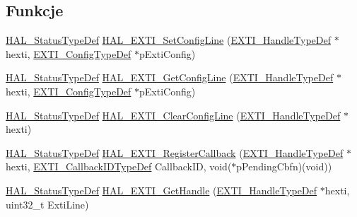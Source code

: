 \subsection*{Funkcje}
\begin{DoxyCompactItemize}
\item 
\hyperlink{stm32f4xx__hal__def_8h_a63c0679d1cb8b8c684fbb0632743478f}{H\+A\+L\+\_\+\+Status\+Type\+Def} \hyperlink{group___e_x_t_i___exported___functions___group1_ga21c31dc6d13f1e32b4352e00ab6ad2b3}{H\+A\+L\+\_\+\+E\+X\+T\+I\+\_\+\+Set\+Config\+Line} (\hyperlink{struct_e_x_t_i___handle_type_def}{E\+X\+T\+I\+\_\+\+Handle\+Type\+Def} $\ast$hexti, \hyperlink{struct_e_x_t_i___config_type_def}{E\+X\+T\+I\+\_\+\+Config\+Type\+Def} $\ast$p\+Exti\+Config)
\item 
\hyperlink{stm32f4xx__hal__def_8h_a63c0679d1cb8b8c684fbb0632743478f}{H\+A\+L\+\_\+\+Status\+Type\+Def} \hyperlink{group___e_x_t_i___exported___functions___group1_gabc6617165a2712df438f38509c8205dd}{H\+A\+L\+\_\+\+E\+X\+T\+I\+\_\+\+Get\+Config\+Line} (\hyperlink{struct_e_x_t_i___handle_type_def}{E\+X\+T\+I\+\_\+\+Handle\+Type\+Def} $\ast$hexti, \hyperlink{struct_e_x_t_i___config_type_def}{E\+X\+T\+I\+\_\+\+Config\+Type\+Def} $\ast$p\+Exti\+Config)
\item 
\hyperlink{stm32f4xx__hal__def_8h_a63c0679d1cb8b8c684fbb0632743478f}{H\+A\+L\+\_\+\+Status\+Type\+Def} \hyperlink{group___e_x_t_i___exported___functions___group1_gae8ed1defdcf965a62618af09c45c7866}{H\+A\+L\+\_\+\+E\+X\+T\+I\+\_\+\+Clear\+Config\+Line} (\hyperlink{struct_e_x_t_i___handle_type_def}{E\+X\+T\+I\+\_\+\+Handle\+Type\+Def} $\ast$hexti)
\item 
\hyperlink{stm32f4xx__hal__def_8h_a63c0679d1cb8b8c684fbb0632743478f}{H\+A\+L\+\_\+\+Status\+Type\+Def} \hyperlink{group___e_x_t_i___exported___functions___group1_gacb6ee7e9f2429c3c3a1c99d4fe2d26d7}{H\+A\+L\+\_\+\+E\+X\+T\+I\+\_\+\+Register\+Callback} (\hyperlink{struct_e_x_t_i___handle_type_def}{E\+X\+T\+I\+\_\+\+Handle\+Type\+Def} $\ast$hexti, \hyperlink{group___e_x_t_i___exported___types_ga0ff36e8796a6ad3f2fc211e534c54c0e}{E\+X\+T\+I\+\_\+\+Callback\+I\+D\+Type\+Def} Callback\+ID, void($\ast$p\+Pending\+Cbfn)(void))
\item 
\hyperlink{stm32f4xx__hal__def_8h_a63c0679d1cb8b8c684fbb0632743478f}{H\+A\+L\+\_\+\+Status\+Type\+Def} \hyperlink{group___e_x_t_i___exported___functions___group1_gaa5856ee92dc1265db144af025673ee46}{H\+A\+L\+\_\+\+E\+X\+T\+I\+\_\+\+Get\+Handle} (\hyperlink{struct_e_x_t_i___handle_type_def}{E\+X\+T\+I\+\_\+\+Handle\+Type\+Def} $\ast$hexti, uint32\+\_\+t Exti\+Line)
\end{DoxyCompactItemize}



